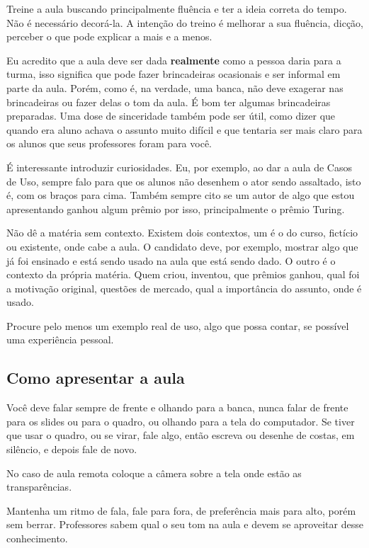 \documentclass{article}
\begin{document}
Treine a aula buscando principalmente fluência e ter a ideia correta do tempo. Não é necessário decorá-la. A intenção do treino é melhorar a sua fluência, dicção, perceber o que pode explicar a mais e a menos.

Eu acredito que a aula deve ser dada \textbf{realmente} como a pessoa daria para a turma, isso significa que pode fazer brincadeiras ocasionais e ser informal em parte da aula. Porém, como é, na verdade, uma banca, não deve exagerar nas brincadeiras ou fazer delas o tom da aula. É bom ter algumas brincadeiras preparadas. Uma dose de sinceridade também pode ser útil, como dizer que quando era aluno achava o assunto muito difícil e que tentaria ser mais claro para os alunos que seus professores foram para você.

É interessante introduzir curiosidades. Eu, por exemplo, ao dar a aula de Casos de Uso, sempre falo para que os alunos não desenhem o ator sendo assaltado, isto é, com os braços para cima. Também sempre cito se um autor de algo que estou apresentando ganhou algum prêmio por isso, principalmente o prêmio Turing.

Não dê a matéria sem contexto. Existem dois contextos, um é o do curso, fictício ou existente, onde cabe a aula. O candidato deve, por exemplo, mostrar algo que já foi ensinado e está sendo usado na aula que está sendo dado. O outro é o contexto da própria matéria. Quem criou, inventou, que prêmios ganhou, qual foi a motivação original, questões de mercado, qual a importância do assunto, onde é usado.

Procure pelo menos um exemplo real de uso, algo que possa contar, se possível uma experiência pessoal.

\subsection{Como apresentar a aula}

Você deve falar sempre de frente e olhando para a banca, nunca falar de frente para os slides ou para o quadro, ou olhando para a tela do computador. Se tiver que usar o quadro, ou se virar, fale algo, então escreva ou desenhe de costas, em silêncio, e depois fale de novo.

No caso de aula remota coloque a câmera sobre a tela onde estão as transparências.

Mantenha um ritmo de fala, fale para fora, de preferência mais para alto, porém sem berrar. Professores sabem qual o seu tom na aula e devem se aproveitar desse conhecimento.
\end{document}
